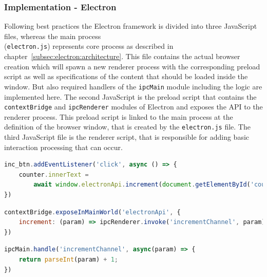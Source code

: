 \subsubsection{Implementation - Electron}
\label{subsubsec:impl:electron}
Following best practices the Electron framework is divided into three JavaScript files, whereas the main process \\(\texttt{electron.js}) represents core process as described in chapter~\ref{subsec:electron:architecture}.
This file contains the actual browser creation which will spawn a new renderer process  with the corresponding preload script as well as specifications of the content that should be loaded inside the window.
But also required handlers of the \texttt{ipcMain} module including the logic are implemented here.
The second JavaScript is the preload script that contains the \texttt{contextBridge}  and \texttt{ipcRenderer} modules of Electron and exposes the \ac{API} to the renderer process.
This preload script is linked to the main process at the definition of the browser window, that is created by the \texttt{electron.js} file.
The third JavaScript file is the renderer script, that is responsible for adding basic interaction processing that can occur.

\begin{lstlisting}[language=JavaScript,label={lst:rendererjs}, caption={Excerpt of render.js}]
inc_btn.addEventListener('click', async () => {
    counter.innerText =
        await window.electronApi.increment(document.getElementById('counter').innerText)
})
\end{lstlisting}
\begin{lstlisting}[language=JavaScript,label={lst:preloadjs}, caption={Excerpt of preload.js}]
contextBridge.exposeInMainWorld('electronApi', {
    increment: (param) => ipcRenderer.invoke('incrementChannel', param)
})
\end{lstlisting}
\begin{lstlisting}[language=JavaScript,label={lst:electronjs}, caption={Excerpt of electron.js}]
ipcMain.handle('incrementChannel', async(param) => {
    return parseInt(param) + 1;
})
\end{lstlisting}

